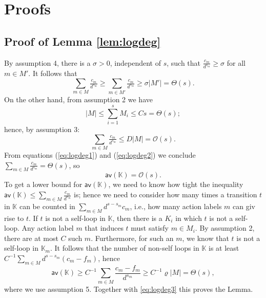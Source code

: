 \documentclass[runngingheads]{llncs}
\begin{document}




\appendix
\appendix

\section{Proofs}

\subsection{Proof of Lemma \ref{lem:logdeg}}

By assumption 4, there is a $\sigma > 0$, independent of $s$, such that $\tfrac{c_m}{d^{s_m}} \geq \sigma$ for all $m \in M'$. It follows that
\begin{equation} \label{eq:logdeg1}
\sum_{m \in M}  \tfrac{c_m}{d^{s_m}}  \geq \sum_{m \in M'}  \tfrac{c_m}{d^{s_m}} \geq \sigma|M'| = \Theta(s).
\end{equation}
On the other hand, from assumption 2 we have 
\begin{equation*}
|M| \leq \sum_{i=1}^s M_i \leq Cs = \Theta(s);
\end{equation*}
hence, by assumption 3:
\begin{equation} \label{eq:logdeg2}
\sum_{m \in M}  \tfrac{c_m}{d^{s_m}} \leq D|M| = \mathcal{O}(s).
\end{equation}
From equations (\ref{eq:logdeg1}) and (\ref{eq:logdeg2}) we conclude $\sum_{m \in M}  \tfrac{c_m}{d^{s_m}} = \Theta(s)$, so
\begin{equation} \label{eq:logdeg3}
\mathsf{av}(\mathbb{K}) = \mathcal{O}(s).
\end{equation}
To get a lower bound for $\mathsf{av}(\mathbb{K})$, we need to know how tight the inequality $\mathsf{av}(\mathbb{K}) \leq \sum_{m \in M}  \tfrac{c_m}{d^{s_m}}$ is; hence we need to consider how many times a transition $t$ in $\mathbb{K}$ can be counted in $\sum_{m \in M} d^{s-s_m} c_m$, i.e., how many action labels $m$ can giv rise to $t$. If $t$ is not a self-loop in $\mathbb{K}$, then there is a $K_i$ in which $t$ is not a self-loop. Any action label $m$ that induces $t$ must satisfy $m \in M_i$. By assumption 2, there are at most $C$ such $m$. Furthermore, for such an $m$, we know that $t$ is not a self-loop in $\mathbb{K}_m$. It follows that the number of non-self loops in $\mathbb{K}$ is at least $C^{-1}\sum_{m \in M} d^{s-s_m}(c_m-f_m)$, hence
\[
\mathsf{av}(\mathbb{K}) \geq C^{-1}\sum_{m \in M} \frac{c_m-f_m}{d^{s_m}} \geq C^{-1}\varrho|M| = \Theta(s),
\]
where we use assumption 5. Together with \eqref{eq:logdeg3} this proves the Lemma.
\end{document}
